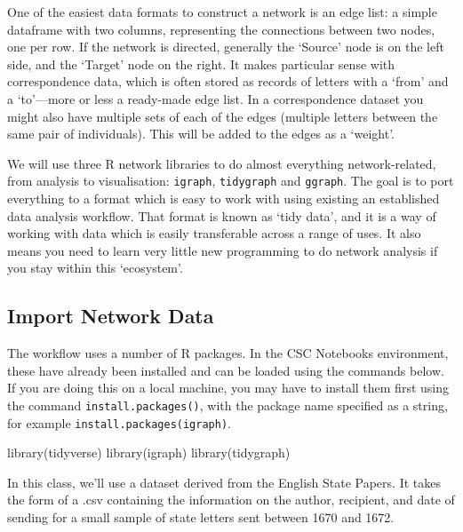 \documentclass[
]{book}
\newenvironment{Shaded}{\begin{snugshade}}{\end{snugshade}}
\newcommand{\FunctionTok}[1]{\textcolor[rgb]{0.00,0.00,0.00}{#1}}
\newcommand{\NormalTok}[1]{#1}
\begin{document}
One of the easiest data formats to construct a network is an edge list: a simple dataframe with two columns, representing the connections between two nodes, one per row. If the network is directed, generally the `Source' node is on the left side, and the `Target' node on the right. It makes particular sense with correspondence data, which is often stored as records of letters with a `from' and a `to'---more or less a ready-made edge list. In a correspondence dataset you might also have multiple sets of each of the edges (multiple letters between the same pair of individuals). This will be added to the edges as a `weight'.

We will use three R network libraries to do almost everything network-related, from analysis to visualisation: \texttt{igraph}, \texttt{tidygraph} and \texttt{ggraph}. The goal is to port everything to a format which is easy to work with using existing an established data analysis workflow. That format is known as `tidy data', and it is a way of working with data which is easily transferable across a range of uses. It also means you need to learn very little new programming to do network analysis if you stay within this `ecosystem'.

\hypertarget{import-network-data}{%
\subsection{Import Network Data}\label{import-network-data}}

The workflow uses a number of R packages. In the CSC Notebooks environment, these have already been installed and can be loaded using the commands below. If you are doing this on a local machine, you may have to install them first using the command \texttt{install.packages()}, with the package name specified as a string, for example \texttt{install.packages(\textquotesingle{}igraph\textquotesingle{})}.

\begin{Shaded}
\begin{Highlighting}[]
\FunctionTok{library}\NormalTok{(tidyverse)}
\FunctionTok{library}\NormalTok{(igraph)}
\FunctionTok{library}\NormalTok{(tidygraph)}
\end{Highlighting}
\end{Shaded}

In this class, we'll use a dataset derived from the English State Papers. It takes the form of a .csv containing the information on the author, recipient, and date of sending for a small sample of state letters sent between 1670 and 1672.
\end{document}
